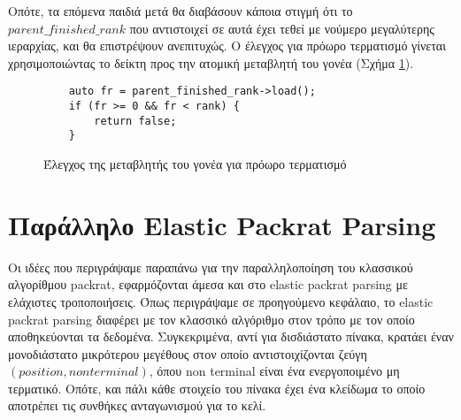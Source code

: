 Οπότε, τα επόμενα παιδιά μετά θα διαβάσουν κάποια στιγμή ότι το $parent\_finished\_rank$ που αντιστοιχεί σε αυτά έχει τεθεί με νούμερο μεγαλύτερης ιεραρχίας, και θα επιστρέψουν ανεπιτυχώς.
Ο έλεγχος για πρόωρο τερματισμό γίνεται χρησιμοποιώντας το δείκτη προς την ατομική μεταβλητή του γονέα (Σχήμα \ref{fig:rec_top_down_stop}).

\begin{figure}[h]
\setlength\partopsep{-\topsep}%
\begin{verbatim}
    auto fr = parent_finished_rank->load();
    if (fr >= 0 && fr < rank) { 
        return false;
    }
\end{verbatim}
\caption{Έλεγχος της μεταβλητής του γονέα για πρόωρο τερματισμό}
  \label{fig:rec_top_down_stop}
\end{figure}


\section{Παράλληλο Elastic Packrat Parsing}
Οι ιδέες που περιγράψαμε παραπάνω για την παραλληλοποίηση του κλασσικού αλγορίθμου packrat, εφαρμόζονται άμεσα και στο elastic packrat parsing με ελάχιστες τροποποιήσεις.
Όπως περιγράψαμε σε προηγούμενο κεφάλαιο, το elastic packrat parsing διαφέρει με τον κλασσικό αλγόριθμο στον τρόπο με τον οποίο αποθηκεύονται τα δεδομένα.
Συγκεκριμένα, αντί για δισδιάστατο πίνακα, κρατάει έναν μονοδιάστατο μικρότερου μεγέθους στον οποίο αντιστοιχίζονται ζεύγη $(position, non terminal)$, όπου non terminal είναι ένα ενεργοποιμένο μη τερματικό.
Οπότε, και πάλι κάθε στοιχείο του πίνακα έχει ένα κλείδωμα το οποίο αποτρέπει τις συνθήκες ανταγωνισμού για το κελί.

